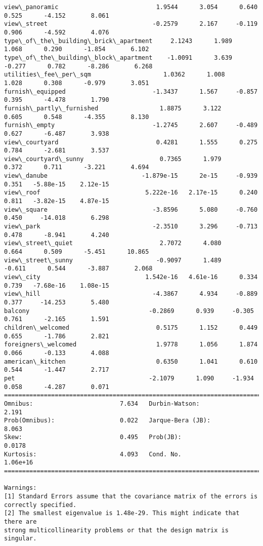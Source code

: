 \documentclass[11pt]{article}
\begin{document}
\begin{Verbatim}[commandchars=\\\{\}]
view\_panoramic                           1.9544      3.054      0.640      0.525      -4.152       8.061
view\_street                             -0.2579      2.167     -0.119      0.906      -4.592       4.076
type\_of\_the\_building\_brick\_apartment     2.1243      1.989      1.068      0.290      -1.854       6.102
type\_of\_the\_building\_block\_apartment    -1.0091      3.639     -0.277      0.782      -8.286       6.268
utilities\_fee\_per\_sqm                    1.0362      1.008      1.028      0.308      -0.979       3.051
furnish\_equipped                        -1.3437      1.567     -0.857      0.395      -4.478       1.790
furnish\_partly\_furnished                 1.8875      3.122      0.605      0.548      -4.355       8.130
furnish\_empty                           -1.2745      2.607     -0.489      0.627      -6.487       3.938
view\_courtyard                           0.4281      1.555      0.275      0.784      -2.681       3.537
view\_courtyard\_sunny                     0.7365      1.979      0.372      0.711      -3.221       4.694
view\_danube                          -1.879e-15      2e-15     -0.939      0.351   -5.88e-15    2.12e-15
view\_roof                             5.222e-16   2.17e-15      0.240      0.811   -3.82e-15    4.87e-15
view\_square                             -3.8596      5.080     -0.760      0.450     -14.018       6.298
view\_park                               -2.3510      3.296     -0.713      0.478      -8.941       4.240
view\_street\_quiet                        2.7072      4.080      0.664      0.509      -5.451      10.865
view\_street\_sunny                       -0.9097      1.489     -0.611      0.544      -3.887       2.068
view\_city                             1.542e-16   4.61e-16      0.334      0.739   -7.68e-16    1.08e-15
view\_hill                               -4.3867      4.934     -0.889      0.377     -14.253       5.480
balcony                                 -0.2869      0.939     -0.305      0.761      -2.165       1.591
children\_welcomed                        0.5175      1.152      0.449      0.655      -1.786       2.821
foreigners\_welcomed                      1.9778      1.056      1.874      0.066      -0.133       4.088
american\_kitchen                         0.6350      1.041      0.610      0.544      -1.447       2.717
pet                                     -2.1079      1.090     -1.934      0.058      -4.287       0.071
==============================================================================
Omnibus:                        7.634   Durbin-Watson:                   2.191
Prob(Omnibus):                  0.022   Jarque-Bera (JB):                8.063
Skew:                           0.495   Prob(JB):                       0.0178
Kurtosis:                       4.093   Cond. No.                     1.06e+16
==============================================================================

Warnings:
[1] Standard Errors assume that the covariance matrix of the errors is correctly specified.
[2] The smallest eigenvalue is 1.48e-29. This might indicate that there are
strong multicollinearity problems or that the design matrix is singular.

    \end{Verbatim}
\end{document}
